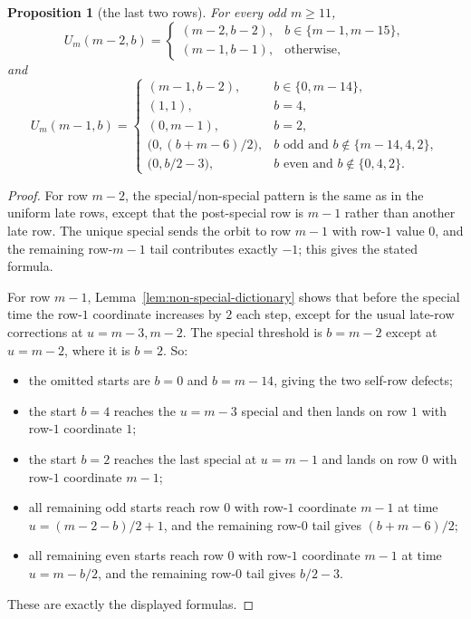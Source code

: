 \documentclass[11pt]{article}
\newtheorem{proposition}[theorem]{Proposition}
\newcommand{\1}{\mathbf 1}
\begin{document}
\begin{proposition}[the last two rows]\label{prop:last-rows}
For every odd $m\ge 11$,
\[
U_m(m-2,b)=
\begin{cases}
(m-2,b-2), & b\in\{m-1,m-15\},\\
(m-1,b-1), & \text{otherwise,}
\end{cases}
\]
and
\[
U_m(m-1,b)=
\begin{cases}
(m-1,b-2), & b\in\{0,m-14\},\\
(1,1), & b=4,\\
(0,m-1), & b=2,\\
\bigl(0,(b+m-6)/2\bigr), & b\text{ odd and }b\notin\{m-14,4,2\},\\
\bigl(0,b/2-3\bigr), & b\text{ even and }b\notin\{0,4,2\}.
\end{cases}
\]
\end{proposition}

\begin{proof}
For row $m-2$, the special/non-special pattern is the same as in the uniform
late rows, except that the post-special row is $m-1$ rather than another late
row. The unique special sends the orbit to row $m-1$ with row-$1$ value $0$,
and the remaining row-$m-1$ tail contributes exactly $-1$; this gives the
stated formula.

For row $m-1$, Lemma~\ref{lem:non-special-dictionary} shows that before the
special time the row-$1$ coordinate increases by $2$ each step, except for the
usual late-row corrections at $u=m-3,m-2$. The special threshold is $b=m-2$
except at $u=m-2$, where it is $b=2$. So:
\begin{itemize}[leftmargin=2em]
\item the omitted starts are $b=0$ and $b=m-14$, giving the two self-row
      defects;
\item the start $b=4$ reaches the $u=m-3$ special and then lands on row $1$
      with row-$1$ coordinate $1$;
\item the start $b=2$ reaches the last special at $u=m-1$ and lands on row $0$
      with row-$1$ coordinate $m-1$;
\item all remaining odd starts reach row $0$ with row-$1$ coordinate $m-1$ at
      time $u=(m-2-b)/2+1$, and the remaining row-$0$ tail gives
      $(b+m-6)/2$;
\item all remaining even starts reach row $0$ with row-$1$ coordinate $m-1$ at
      time $u=m-b/2$, and the remaining row-$0$ tail gives $b/2-3$.
\end{itemize}
These are exactly the displayed formulas.
\end{proof}
\end{document}
